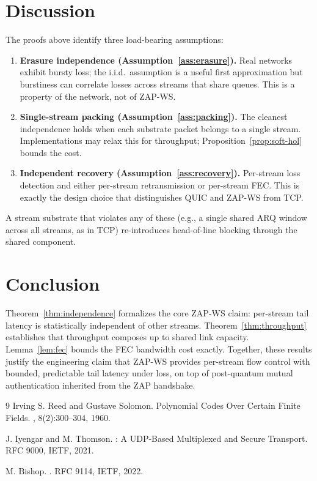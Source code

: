 \documentclass[11pt,a4paper]{article}
\begin{document}
\section{Discussion}

The proofs above identify three load-bearing assumptions:
\begin{enumerate}
\item \textbf{Erasure independence (Assumption~\ref{ass:erasure}).}
Real networks exhibit bursty loss; the i.i.d.\ assumption is a useful
first approximation but burstiness can correlate losses across streams
that share queues. This is a property of the network, not of ZAP-WS.
\item \textbf{Single-stream packing (Assumption~\ref{ass:packing}).}
The cleanest independence holds when each substrate packet belongs to a
single stream. Implementations may relax this for throughput;
Proposition~\ref{prop:soft-hol} bounds the cost.
\item \textbf{Independent recovery (Assumption~\ref{ass:recovery}).}
Per-stream loss detection and either per-stream retransmission or
per-stream FEC. This is exactly the design choice that distinguishes
QUIC and ZAP-WS from TCP.
\end{enumerate}

A stream substrate that violates any of these (e.g., a single shared
ARQ window across all streams, as in TCP) re-introduces head-of-line
blocking through the shared component.

\section{Conclusion}

Theorem~\ref{thm:independence} formalizes the core ZAP-WS claim:
per-stream tail latency is statistically independent of other streams.
Theorem~\ref{thm:throughput} establishes that throughput composes up to
shared link capacity. Lemma~\ref{lem:fec} bounds the FEC bandwidth cost
exactly. Together, these results justify the engineering claim that
ZAP-WS provides per-stream flow control with bounded, predictable tail
latency under loss, on top of post-quantum mutual authentication
inherited from the ZAP handshake.


\begin{thebibliography}{9}
Irving S. Reed and Gustave Solomon.
\newblock Polynomial Codes Over Certain Finite Fields.
, 8(2):300--304, 1960.

J. Iyengar and M. Thomson.
: A {UDP}-Based Multiplexed and Secure Transport.
\newblock RFC 9000, IETF, 2021.

M. Bishop.
.
\newblock RFC 9114, IETF, 2022.
\end{thebibliography}
\end{document}
